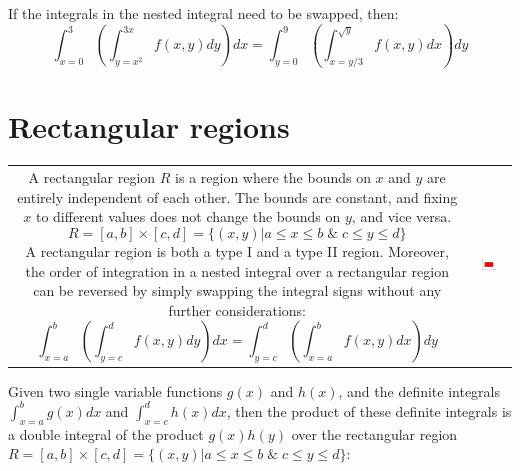 \documentclass{article}
\begin{document}
If the integrals in the nested integral need to be swapped, then: 
\[\int_{x = 0}^3 \left(\int_{y = x^2}^{3x} f(x,y)dy\right)dx = \int_{y = 0}^9 \left(\int_{x = y/3}^{\sqrt{y}} f(x,y)dx\right)dy\]



\pagebreak

\section*{Rectangular regions}

\begin{tabular}{cc}
\parbox{0.5\textwidth}{
A rectangular region \(R\) is a region where the bounds on \(x\) and \(y\) are entirely independent of each other. The bounds are constant, and fixing \(x\) to different values does not change the bounds on \(y\), and vice versa.
\[R = [a, b] \times [c, d] = \{(x, y) | a \leq x \leq b \;\&\; c \leq y \leq d\}\]
A rectangular region is both a type I and a type II region. Moreover, the order of integration in a nested integral over a rectangular region can be reversed by simply swapping the integral signs without any further considerations:
\[\int_{x = a}^b \left(\int_{y = c}^d f(x,y)dy\right)dx = \int_{y = c}^d \left(\int_{x = a}^b f(x,y)dx\right)dy\]
} & \parbox{0.5\textwidth}{
\includegraphics[width = 0.5\textwidth]{rectangular_regions}
}
\end{tabular}


Given two single variable functions \(g(x)\) and \(h(x)\), and the definite integrals \(\int_{x = a}^b g(x)dx\) and \(\int_{x = c}^d h(x)dx\), then the product of these definite integrals is a double integral of the product \(g(x)h(y)\) over the rectangular region \(R = [a, b] \times [c, d] = \{(x, y) | a \leq x \leq b \;\&\; c \leq y \leq d\}\): 
\end{document}
